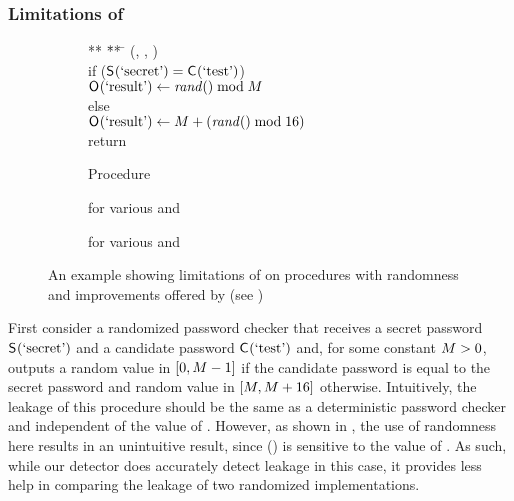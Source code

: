 \subsubsection{Limitations of \Jaccard{\secretsSetSize}}
\label{sscf:sec:measurement:random:limits}

\begin{figure}
  \begin{subfigure}[b]{0.32\linewidth}
  \centering
  \footnotesize{
\begin{tabbing}
      ** \= ** \= \kill
      \proc(\ACIFn{}, \AIIFn{}, \SecFn{}) \\
      \>  if ($\mathsf{S}_{}(\textrm{`secret'}) = \mathsf{C}_{}(\textrm{`test'})$) \\
      \> \> $\mathsf{O}_{}(\textrm{`result'}) \gets \mathit{rand}()\bmod M$ \\
      \>  else \\
      \> \>  $\mathsf{O}_{}(\textrm{`result'}) \gets M + (\mathit{rand}() \bmod 16)$ \\
      \> return \AOOFn{} 
    \end{tabbing}
    \vspace{3ex}
    }
    \caption{Procedure}
    \label{fig:inflating:code}
  \end{subfigure}
\hspace{-2ex}
  \begin{subfigure}[b]{0.32\linewidth}
  \centering
  \resizebox{0.96\linewidth}{!}{\large}
    \caption{\Jaccard{\secretsSetSize} for various \secretsSetSize and \modulus}
    \label{fig:inflating:Jaccard}
  \end{subfigure}%
\hspace{-3ex}
  \begin{subfigure}[b]{0.32\linewidth}
  \centering
  \resizebox{0.96\linewidth}{!}{\large}
    \caption{\JaccardRand{\secretsSetSize} for various \secretsSetSize and \modulus}
    \label{fig:inflating:JaccardRand}
  \end{subfigure}
  \caption{An example showing limitations of \Jaccard{} on
    procedures with randomness and improvements offered by
    \JaccardRand{} (see )}
  \label{fig:inflating}
\end{figure}

First consider a randomized password checker that receives a secret
password $\mathsf{S}_{}(\textrm{`secret'})$ and a candidate password
$\mathsf{C}_{}(\textrm{`test'})$ and, for some constant $M > 0$,
outputs a random value in $[0, M-1]$ if the candidate password
is equal to the secret password and random value in $[M,
  M+16]$ otherwise.  Intuitively, the leakage of this procedure
should be the same as a deterministic password checker and independent
of the value of \modulus.  However, as shown in
, the use of randomness here results in an
unintuitive result, since \Jaccard{\secretsSetSize}
() is sensitive to the value of
\modulus.  As such, while our detector does accurately detect leakage
in this case, it provides less help in comparing the leakage of two
randomized implementations.

